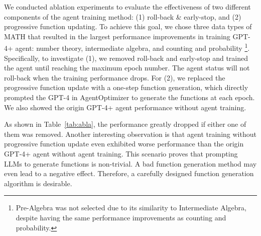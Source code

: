 \documentclass{article}
\theoremstyle{plain}
\theoremstyle{definition}
\theoremstyle{remark}
\begin{document}
We conducted ablation experiments to evaluate the effectiveness of two different components of the agent training method: (1) roll-back \& early-stop, and (2) progressive function updating. 
To achieve this goal, we chose three data types of MATH that resulted in the largest performance improvements in training GPT-4+ agent: number theory, intermediate algebra, and counting and probability
\footnote{Pre-Algebra was not selected due to its similarity to Intermediate Algebra, despite having the same performance improvements as counting and probability.}.
Specifically, to investigate (1), we removed roll-back and early-stop and trained the agent until reaching the maximum epoch number. The agent status will not roll-back when the training performance drops. For (2), we replaced the progressive function update with a one-step function generation, which directly prompted the GPT-4 in AgentOptimizer to generate the functions at each epoch. We also showed the origin GPT-4+ agent performance without agent training.

As shown in Table~\ref{tab:abla}, the performance greatly dropped if either one of them was removed. Another interesting observation is that agent training without progressive function update even exhibited worse performance than the origin GPT-4+ agent without agent training. This scenario proves that prompting LLMs to generate functions is non-trivial. A bad function generation method may even lead to a negative effect. Therefore, a carefully designed function generation algorithm is desirable.
\end{document}
